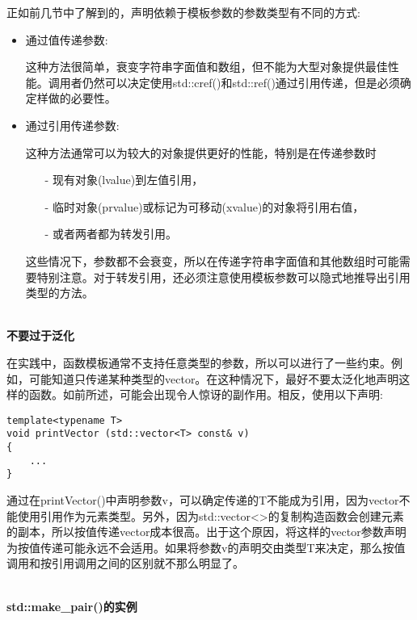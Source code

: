 正如前几节中了解到的，声明依赖于模板参数的参数类型有不同的方式:

\begin{itemize}
\item 
通过值传递参数:

这种方法很简单，衰变字符串字面值和数组，但不能为大型对象提供最佳性能。调用者仍然可以决定使用std::cref()和std::ref()通过引用传递，但是必须确定样做的必要性。

\item 
通过引用传递参数:

这种方法通常可以为较大的对象提供更好的性能，特别是在传递参数时

\begin{itemize}
\item[-]
现有对象(lvalue)到左值引用，

\item[-]
临时对象(prvalue)或标记为可移动(xvalue)的对象将引用右值，

\item[-]
或者两者都为转发引用。
\end{itemize}

这些情况下，参数都不会衰变，所以在传递字符串字面值和其他数组时可能需要特别注意。对于转发引用，还必须注意使用模板参数可以隐式地推导出引用类型的方法。
\end{itemize}

\hspace*{\fill} \\ %
\noindent
\textbf{不要过于泛化}

在实践中，函数模板通常不支持任意类型的参数，所以可以进行了一些约束。例如，可能知道只传递某种类型的vector。在这种情况下，最好不要太泛化地声明这样的函数。如前所述，可能会出现令人惊讶的副作用。相反，使用以下声明:

\begin{lstlisting}[style=styleCXX]
template<typename T>
void printVector (std::vector<T> const& v)
{
	...
}
\end{lstlisting}

通过在printVector()中声明参数v，可以确定传递的T不能成为引用，因为vector不能使用引用作为元素类型。另外，因为std::vector<>的复制构造函数会创建元素的副本，所以按值传递vector成本很高。出于这个原因，将这样的vector参数声明为按值传递可能永远不会适用。如果将参数v的声明交由类型T来决定，那么按值调用和按引用调用之间的区别就不那么明显了。

\hspace*{\fill} \\ %
\noindent
\textbf{std::make\_pair()的实例}

